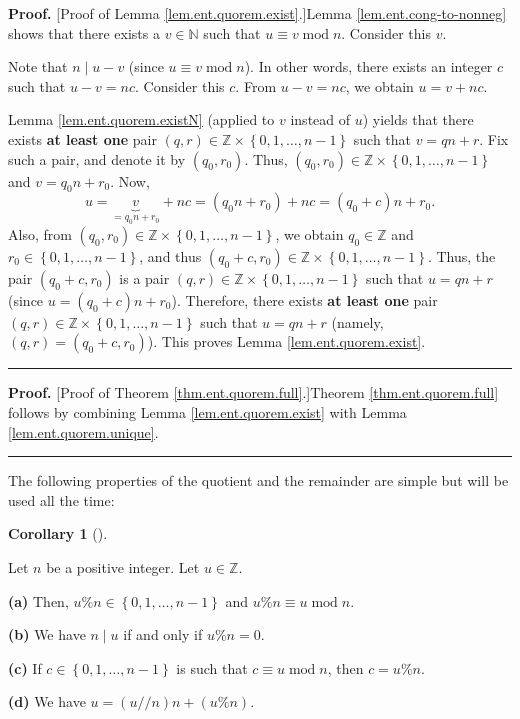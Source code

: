 \documentclass[numbers=enddot,12pt,final,onecolumn,notitlepage]{scrartcl}%
\numberwithin{exer}{subsection}
\theoremstyle{definition}
\newtheorem{coro}[theo]{Corollary}
\newenvironment{corollary}[1][]
{\begin{coro}[#1]\begin{leftbar}}
{\end{leftbar}\end{coro}}
\newenvironment{proof}[1][Proof]{\noindent\textbf{#1.} }{\ \rule{0.5em}{0.5em}}
\begin{document}
\begin{proof}
[Proof of Lemma \ref{lem.ent.quorem.exist}.]Lemma \ref{lem.ent.cong-to-nonneg}
shows that there exists a $v\in\mathbb{N}$ such that $u\equiv
v\operatorname{mod}n$. Consider this $v$.

Note that $n\mid u-v$ (since $u\equiv v\operatorname{mod}n$). In other words,
there exists an integer $c$ such that $u-v=nc$. Consider this $c$. From
$u-v=nc$, we obtain $u=v+nc$.

Lemma \ref{lem.ent.quorem.existN} (applied to $v$ instead of $u$) yields that
there exists \textbf{at least one} pair $\left(  q,r\right)  \in
\mathbb{Z}\times\left\{  0,1,\ldots,n-1\right\}  $ such that $v=qn+r$. Fix
such a pair, and denote it by $\left(  q_{0},r_{0}\right)  $. Thus, $\left(
q_{0},r_{0}\right)  \in\mathbb{Z}\times\left\{  0,1,\ldots,n-1\right\}  $ and
$v=q_{0}n+r_{0}$. Now,%
\[
u=\underbrace{v}_{=q_{0}n+r_{0}}+nc=\left(  q_{0}n+r_{0}\right)  +nc=\left(
q_{0}+c\right)  n+r_{0}.
\]
Also, from $\left(  q_{0},r_{0}\right)  \in\mathbb{Z}\times\left\{
0,1,\ldots,n-1\right\}  $, we obtain $q_{0}\in\mathbb{Z}$ and $r_{0}%
\in\left\{  0,1,\ldots,n-1\right\}  $, and thus $\left(  q_{0}+c,r_{0}\right)
\in\mathbb{Z}\times\left\{  0,1,\ldots,n-1\right\}  $. Thus, the pair $\left(
q_{0}+c,r_{0}\right)  $ is a pair $\left(  q,r\right)  \in\mathbb{Z}%
\times\left\{  0,1,\ldots,n-1\right\}  $ such that $u=qn+r$ (since $u=\left(
q_{0}+c\right)  n+r_{0}$). Therefore, there exists \textbf{at least one} pair
$\left(  q,r\right)  \in\mathbb{Z}\times\left\{  0,1,\ldots,n-1\right\}  $
such that $u=qn+r$ (namely, $\left(  q,r\right)  =\left(  q_{0}+c,r_{0}%
\right)  $). This proves Lemma \ref{lem.ent.quorem.exist}.
\end{proof}

\begin{proof}
[Proof of Theorem \ref{thm.ent.quorem.full}.]Theorem \ref{thm.ent.quorem.full}
follows by combining Lemma \ref{lem.ent.quorem.exist} with Lemma
\ref{lem.ent.quorem.unique}.
\end{proof}

The following properties of the quotient and the remainder are simple but will
be used all the time:

\begin{corollary}
\label{cor.ent.quo-rem.remmod}Let $n$ be a positive integer. Let
$u\in\mathbb{Z}$.

\textbf{(a)} Then, $u\%n\in\left\{  0,1,\ldots,n-1\right\}  $ and $u\%n\equiv
u\operatorname{mod}n$.

\textbf{(b)} We have $n\mid u$ if and only if $u\%n=0$.

\textbf{(c)} If $c\in\left\{  0,1,\ldots,n-1\right\}  $ is such that $c\equiv
u\operatorname{mod}n$, then $c=u\%n$.

\textbf{(d)} We have $u=\left(  u//n\right)  n+\left(  u\%n\right)  $.
\end{corollary}
\end{document}
